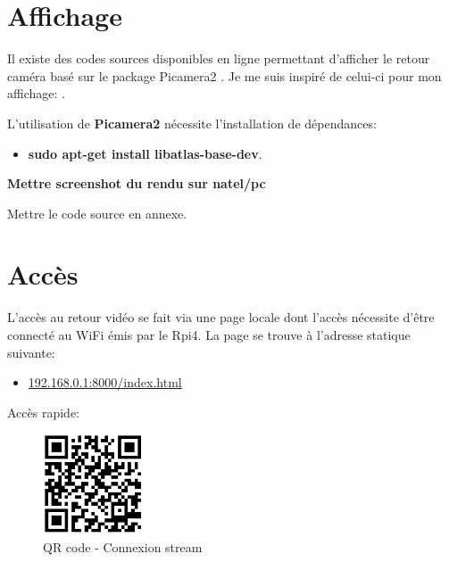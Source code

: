 \section{Affichage}
Il existe des codes sources disponibles en ligne permettant d'afficher le retour caméra basé sur le package Picamera2 \cite{picamera2}.
Je me suis inspiré de celui-ci pour mon affichage: \cite{code_camera}.

L'utilisation de \textbf{Picamera2} nécessite l'installation de dépendances:
\begin{itemize}
    \item \textbf{sudo apt-get install libatlas-base-dev}.
\end{itemize}
\textbf{Mettre screenshot du rendu sur natel/pc}

Mettre le code source en annexe.
\section{Accès}
L'accès au retour vidéo se fait via une page locale dont l'accès nécessite d'être connecté au WiFi émis par le Rpi4.
La page se trouve à l'adresse statique suivante:
\begin{itemize}
    \item  \url{192.168.0.1:8000/index.html}
\end{itemize}
Accès rapide:

\begin{figure}[H]
    \centering
    \includegraphics[width=3cm]{assets/figures/acces_stream.PNG}
    \caption{QR code - Connexion stream}
\end{figure}